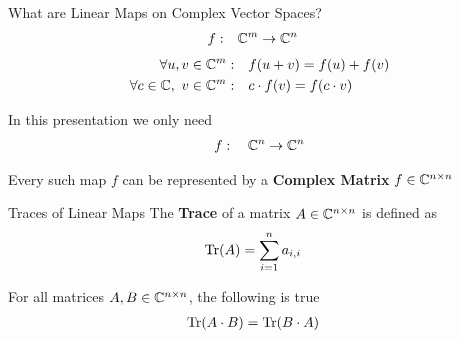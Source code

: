 %

\begin{frame}{What are Linear Maps on Complex Vector Spaces?}
    \Large
    \begin{align*}
        f: \quad & \mathbb{C}^m \to \mathbb{C}^n
    \end{align*}
    \large
    \pause
    \begin{align*}
        \forall u, v \in \mathbb{C}^m: \quad & f(u + v) = f(u) + f(v) \\
        \forall c \in \mathbb{C},\ v \in \mathbb{C}^m: \quad & c \cdot f(v) = f(c \cdot v)
    \end{align*}
    
    \pause
    In this presentation we only need
    \Large
    \begin{align*}
        f: \quad \mathbb{C}^n \to \mathbb{C}^n
    \end{align*}

    \large
    \pause
    Every such map $f$ can be represented by a \textbf{Complex Matrix} $f \in \mathbb{C}^{n \times n}$
    \vspace{2em}
\end{frame}

\begin{frame}{Traces of Linear Maps}
    The \textbf{Trace} of a matrix $A \in \mathbb{C}^{n \times n}$ is defined as
    \pause
    \begin{align*}
        \operatorname{Tr}(A) & = \sum_{i = 1}^n a_{i, i}
    \end{align*}
    
    \pause
    For all matrices $A, B \in \mathbb{C}^{n \times n}$, the following is true
    \begin{align*}
        \operatorname{Tr}(A \cdot B) & = \operatorname{Tr}(B \cdot A)
    \end{align*}
\end{frame}

